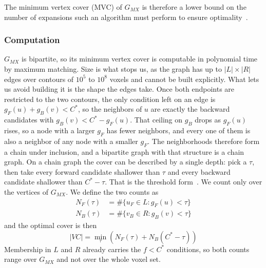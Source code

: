\documentclass[letterpaper]{article} %
\begin{document}
The minimum vertex cover (MVC) of $G_{MX}$ is therefore a lower bound on the number of expansions such an algorithm must perform to ensure optimality~\cite{chen2017nbs}.

\subsubsection{Computation}\label{sec:computation}
$G_{MX}$ is bipartite, so its minimum vertex cover is computable in polynomial time by maximum matching. Size is what stops us, as the graph has up to $|L|\times|R|$ edges over contours of $10^5$ to $10^8$ voxels and cannot be built explicitly. What lets us avoid building it is the shape the edges take. Once both endpoints are restricted to the two contours, the only condition left on an edge is $g_F(u)+g_B(v) < C^*$, so the neighbors of $u$ are exactly the backward candidates with $g_B(v) < C^*-g_F(u)$. That ceiling on $g_B$ drops as $g_F(u)$ rises, so a node with a larger $g_F$ has fewer neighbors, and every one of them is also a neighbor of any node with a smaller $g_F$. The neighborhoods therefore form a chain under inclusion, and a bipartite graph with that structure is a chain graph. On a chain graph the cover can be described by a single depth: pick a $\tau$, then take every forward candidate shallower than $\tau$ and every backward candidate shallower than $C^*-\tau$. That is the threshold form~\cite{shaham2018consistent}. We count only over the vertices of $G_{MX}$. We define the two counts as
\begin{align*} N_F(\tau) &= \#\{u_F \in L: g_F(u) < \tau\}\\ N_B(\tau) &= \#\{v_B \in R: g_B(v) < \tau\}
\end{align*} and the optimal cover is then \[|VC| = \min_\tau \left( N_F(\tau) + N_B(C^*-\tau) \right)\] Membership in $L$ and $R$ already carries the $f<C^*$ conditions, so both counts range over $G_{MX}$ and not over the whole voxel set.
\end{document}
